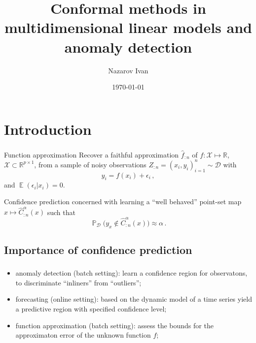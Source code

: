 \documentclass[t]{beamer}  %
\title{Conformal methods in multidimensional linear models and anomaly detection}
\author[Nazarov Ivan]{Nazarov Ivan}
\date{\today}
\institute[Higher School of Economics]{National Research University \\ Higher School of Economics}
\newcommand{\Dcal}{\mathcal{D}}
\newcommand{\Xcal}{\mathcal{X}}
\newcommand{\Real}{\mathbb{R}}
\newcommand{\ex}{\mathop{\mathbb{E}}\nolimits}
\newcommand{\pr}{\mathop{\mathbb{P}}\nolimits}
\begin{document}
\frame[plain]{\titlepage} %

\section{Introduction} %
\label{sec:introduction}

\begin{frame}[c]\frametitle{\insertsection}
  \begin{block}{Function approximation}
    Recover a faithful approximation $\hat{f}_{:n}$ of $f:\Xcal \mapsto \Real$, $\Xcal\subset \Real^{p\times 1}$,
    from a sample of noisy observations $Z_{:n} = (x_i, y_i)_{i=1}^n \sim \Dcal$ with
    $$ y_i = f(x_i) + \epsilon_i \,, $$
    and $\ex(\epsilon_i|x_i) = 0$.
  \end{block}

  \begin{block}{Confidence prediction}
    concerned with learning a ``well behaved'' point-set map $x \mapsto \hat{C}_{:n}^\alpha(x)$
    such that
    $$ \pr_\Dcal\bigl(y_x \notin \hat{C}_{:n}^\alpha(x)\bigr) \approx \alpha \,. $$
  \end{block}
\end{frame}

\subsection{Importance of confidence prediction} %
\label{sub:importance_of_cp}

\begin{frame}[c]\frametitle{\insertsection}
  \framesubtitle{\insertsubsection}
  \begin{itemize}
    \item anomaly detection (batch setting): learn a confidence region for observatons,
    to discriminate ``inliners'' from ``outliers'';
    \item forecasting (online setting): based on the dynamic model of a time series
    yield a predictive region with specified confidence level;
    \item function approximation (batch setting): assess the bounds for the approximaton
    error of the unknown function $f$;
  \end{itemize}
\end{frame}

\end{document}
